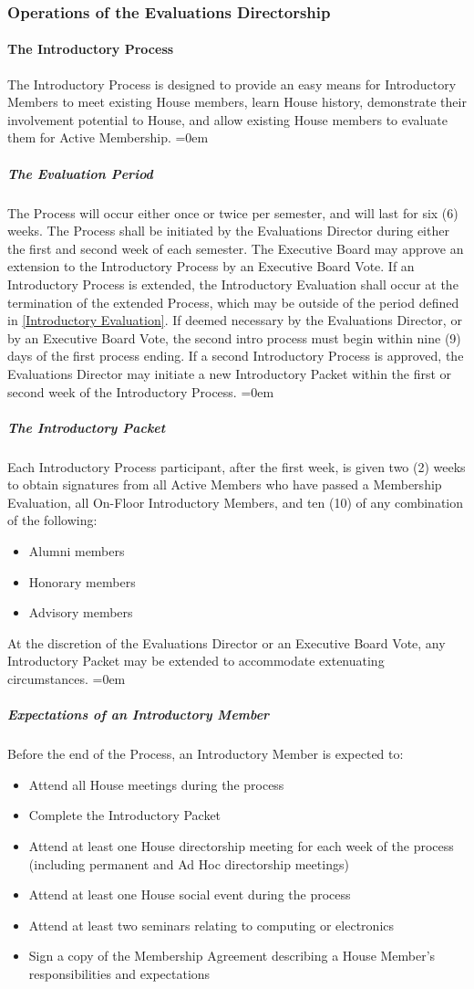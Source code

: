 \documentclass{article}
\newcommand{\asubsection}[1]{\subsubsection{#1} \label{#1}}
\newcommand{\asubsubsection}[1]{\paragraph{#1} \label{#1}}
\newcommand{\asubsubsubsection}[1]{\parindent=0em\subparagraph{#1} \label{#1}}
\begin{document}
\asubsection{Operations of the Evaluations Directorship}
\asubsubsection{The Introductory Process}
The Introductory Process is designed to provide an easy means for Introductory Members to meet existing House members, learn House history, demonstrate their involvement potential to House, and allow existing House members to evaluate them for Active Membership.
\asubsubsubsection{The Evaluation Period}
The Process will occur either once or twice per semester, and will last for six (6) weeks.
The Process shall be initiated by the Evaluations Director during either the first and second week of each semester.
The Executive Board may approve an extension to the Introductory Process by an Executive Board Vote.
If an Introductory Process is extended, the Introductory Evaluation shall occur at the termination of the extended Process, which may be outside of the period defined in \ref{Introductory Evaluation}.
If deemed necessary by the Evaluations Director, or by an Executive Board Vote, the second intro process must begin within nine (9) days of the first process ending.
If a second Introductory Process is approved, the Evaluations Director may initiate a new Introductory Packet within the first or second week of the Introductory Process.
\asubsubsubsection{The Introductory Packet}
Each Introductory Process participant, after the first week, is given two (2) weeks to obtain signatures from all Active Members who have passed a Membership Evaluation, all On-Floor Introductory Members, and ten (10) of any combination of the following:
\begin{itemize}
	\item Alumni members
	\item Honorary members
	\item Advisory members
\end{itemize}
At the discretion of the Evaluations Director or an Executive Board Vote, any Introductory Packet may be extended to accommodate extenuating circumstances.
\asubsubsubsection{Expectations of an Introductory Member}
Before the end of the Process, an Introductory Member is expected to:
\begin{itemize}
\item Attend all House meetings during the process
\item Complete the Introductory Packet
\item Attend at least one House directorship meeting for each week of the process (including permanent and Ad Hoc directorship meetings)
\item Attend at least one House social event during the process
\item Attend at least two seminars relating to computing or electronics
\item Sign a copy of the Membership Agreement describing a House Member’s responsibilities and expectations
\end{itemize}
\end{document}
